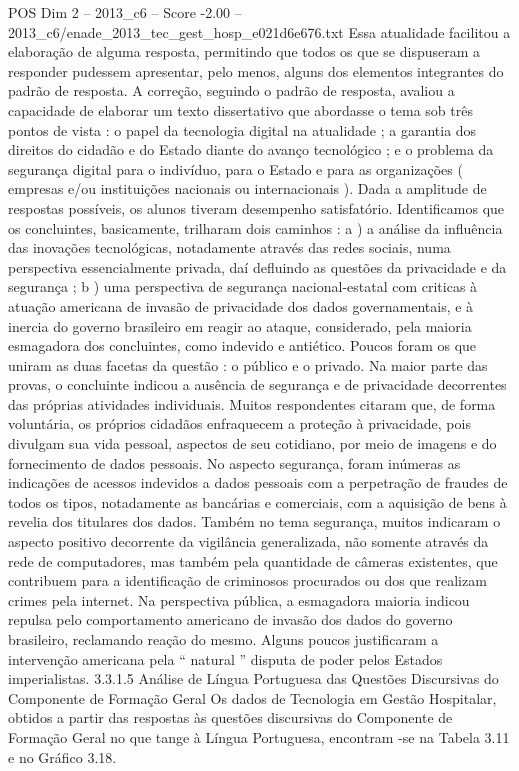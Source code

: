 \begin{textsample}{POS Dim 2 – 2013\_c6 – Score -2.00 – 2013\_c6/enade\_2013\_tec\_gest\_hosp\_e021d6e676.txt}
Essa atualidade facilitou a elaboração de alguma resposta, permitindo que todos os que se dispuseram a responder pudessem apresentar, pelo menos, alguns dos elementos integrantes do padrão de resposta.
A correção, seguindo o padrão de resposta, avaliou a capacidade de elaborar um texto dissertativo que abordasse o tema sob três pontos de vista : o papel da tecnologia digital na atualidade ; a garantia dos direitos do cidadão e do Estado diante do avanço tecnológico ; e o problema da segurança digital para o indivíduo, para o Estado e para as organizações ( empresas e/ou instituições nacionais ou internacionais ).
Dada a amplitude de respostas possíveis, os alunos tiveram desempenho satisfatório.
Identificamos que os concluintes, basicamente, trilharam dois caminhos : a ) a análise da influência das inovações tecnológicas, notadamente através das redes sociais, numa perspectiva essencialmente privada, daí defluindo as questões da privacidade e da segurança ; b ) uma perspectiva de segurança nacional-estatal com criticas à atuação americana de invasão de privacidade dos dados governamentais, e à inercia do governo brasileiro em reagir ao ataque, considerado, pela maioria esmagadora dos concluintes, como indevido e antiético.
Poucos foram os que uniram as duas facetas da questão : o público e o privado.
Na maior parte das provas, o concluinte indicou a ausência de segurança e de privacidade decorrentes das próprias atividades individuais.
Muitos respondentes citaram que, de forma voluntária, os próprios cidadãos enfraquecem a proteção à privacidade, pois divulgam sua vida pessoal, aspectos de seu cotidiano, por meio de imagens e do fornecimento de dados pessoais.
No aspecto segurança, foram inúmeras as indicações de acessos indevidos a dados pessoais com a perpetração de fraudes de todos os tipos, notadamente as bancárias e comerciais, com a aquisição de bens à revelia dos titulares dos dados.
Também no tema segurança, muitos indicaram o aspecto positivo decorrente da vigilância generalizada, não somente através da rede de computadores, mas também pela quantidade de câmeras existentes, que contribuem para a identificação de criminosos procurados ou dos que realizam crimes pela internet.
Na perspectiva pública, a esmagadora maioria indicou repulsa pelo comportamento americano de invasão dos dados do governo brasileiro, reclamando reação do mesmo.
Alguns poucos justificaram a intervenção americana pela “ natural ” disputa de poder pelos Estados imperialistas. 3.3.1.5 Análise de Língua Portuguesa das Questões Discursivas do Componente de Formação Geral Os dados de Tecnologia em Gestão Hospitalar, obtidos a partir das respostas às questões discursivas do Componente de Formação Geral no que tange à Língua Portuguesa, encontram -se na Tabela 3.11 e no Gráfico 3.18.

\end{textsample}
